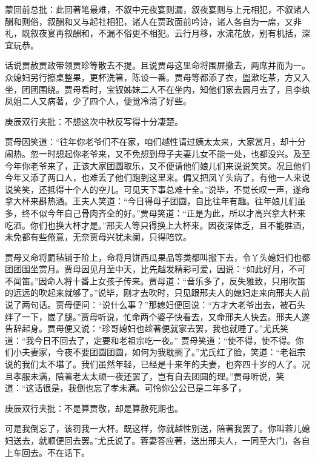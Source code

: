 \begin{parag}
    \begin{note}蒙回前总批：此回著笔最难，不叙中元夜宴则漏，叙夜宴则与上元相犯，不叙诸人酬和则俗，叙酬和又与起社相犯，诸人在贾政面前吟诗，诸人各自为一席，又非礼，既叙夜宴再叙酬和，不漏不俗更不相犯。云行月移，水流花放，别有机括，深宜玩恭。\end{note}
\end{parag}


\begin{parag}
    话说贾赦贾政带领贾珍等散去不提。且说贾母这里命将围屏撤去，两席并而为一。众媳妇另行擦桌整果，更杯洗箸，陈设一番。贾母等都添了衣，盥漱吃茶，方又入坐，团团围绕。贾母看时，宝钗姊妹二人不在坐内，知他们家去圆月去了，且李纨凤姐二人又病著，少了四个人，便觉冷清了好些。\begin{note}庚辰双行夹批：不想这次中秋反写得十分凄楚。\end{note}贾母因笑道：“往年你老爷们不在家，咱们越性请过姨太太来，大家赏月，却十分闹热。忽一时想起你老爷来，又不免想到母子夫妻儿女不能一处，也都没兴。及至今年你老爷来了，正该大家团圆取乐，又不便请他们娘儿们来说说笑笑。况且他们今年又添了两口人，也难丢了他们跑到这里来。偏又把凤丫头病了，有他一人来说说笑笑，还抵得十个人的空儿。可见天下事总难十全。”说毕，不觉长叹一声，遂命拿大杯来斟热酒。王夫人笑道：“今日得母子团圆，自比往年有趣。往年娘儿们虽多，终不似今年自己骨肉齐全的好。”贾母笑道：“正是为此，所以才高兴拿大杯来吃酒。你们也换大杯才是。”邢夫人等只得换上大杯来。因夜深体乏，且不能胜酒，未免都有些倦意，无奈贾母兴犹未阑，只得陪饮。
\end{parag}


\begin{parag}
    贾母又命将罽毡铺于阶上，命将月饼西瓜果品等类都叫搬下去，令丫头媳妇们也都团团围坐赏月。贾母因见月至中天，比先越发精彩可爱，因说：“如此好月，不可不闻笛。”因命人将十番上女孩子传来。贾母道：“音乐多了，反失雅致，只用吹笛的远远的吹起来就够了。”说毕，刚才去吹时，只见跟邢夫人的媳妇走来向邢夫人前说了两句话。贾母便问：“说什么事？”那媳妇便回说：“方才大老爷出去，被石头绊了一下，崴了腿。”贾母听说，忙命两个婆子快看去，又命邢夫人快去。邢夫人遂告辞起身。贾母便又说：“珍哥媳妇也趁著便就家去罢，我也就睡了。”尤氏笑道：“我今日不回去了，定要和老祖宗吃一夜。” 贾母笑道：“使不得，使不得。你们小夫妻家，今夜不要团圆团圆，如何为我耽搁了。”尤氏红了脸，笑道：“老祖宗说的我们太不堪了。我们虽然年轻，已经是十来年的夫妻，也奔四十岁的人了。况且孝服未满，陪著老太太顽一夜还罢了，岂有自去团圆的理。”贾母听说，笑道：“这话很是，我倒也忘了孝未满。可怜你公公已是二年多了，\begin{note}庚辰双行夹批：不是算贾敬，却是算赦死期也。\end{note}可是我倒忘了，该罚我一大杯。既这样，你就越性别送，陪著我罢了。你叫蓉儿媳妇送去，就顺便回去罢。”尤氏说了。蓉妻答应著，送出邢夫人，一同至大门，各自上车回去。不在话下。
\end{parag}


